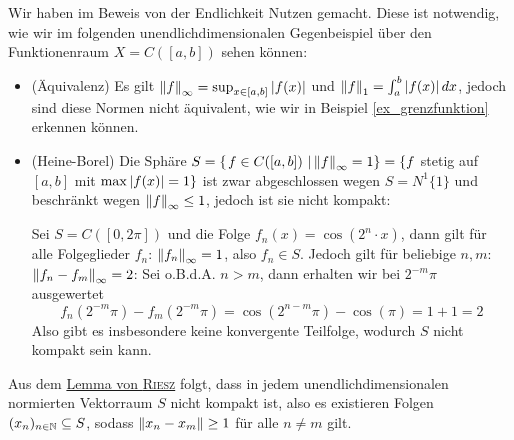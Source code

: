 \begin{remark}
Wir haben im Beweis von der Endlichkeit Nutzen gemacht. Diese ist notwendig, wie wir im folgenden unendlichdimensionalen Gegenbeispiel über den Funktionenraum $X = C([a,b])$ sehen können:

\begin{itemize}
    \item (Äquivalenz) Es gilt $\left\|f\right\|_\infty = \sup_{x\in[a,b]}\left|f(x)\right|$ und $\left\|f\right\|_1 = \int_a^b\left|f(x)\right|dx$, jedoch sind diese Normen nicht äquivalent, wie wir in Beispiel \ref{ex_grenzfunktion} erkennen können.
    \item (Heine-Borel) Die Sphäre $S = \left\{\left.f\in C([a,b]) \ \right| \left\|f\right\|_\infty = 1 \right\} = \{f$ stetig auf $[a,b]$ mit $\max\left|f(x)\right| = 1\}$ ist zwar abgeschlossen wegen $S=N^1{\{1\}}$ und beschränkt wegen $\left\|f\right\|_\infty\leq 1$, jedoch ist sie nicht kompakt:
    
    Sei $S = C([0, 2\pi])$ und die Folge $f_n(x) = \cos(2^n\cdot x)$, dann gilt für alle Folgeglieder $f_n$: $\left\|f_n\right\|_\infty = 1$, also $f_n \in S$. Jedoch gilt für beliebige $n,m$: $\left\|f_n - f_m\right\|_\infty = 2$: Sei o.B.d.A. $n>m$, dann erhalten wir bei $2^{-m}\pi$ ausgewertet 
    $$f_n(2^{-m}\pi) - f_m(2^{-m}\pi) = \cos(2^{n-m}\pi) - \cos(\pi) = 1 + 1 = 2$$
    Also gibt es insbesondere keine konvergente Teilfolge, wodurch $S$ nicht kompakt sein kann.
\end{itemize}
Aus dem \href{https://en.wikipedia.org/wiki/Riesz\%27s_lemma}{Lemma von \textsc{Riesz}} folgt, dass in jedem unendlichdimensionalen normierten Vektorraum $S$ nicht kompakt ist, also es existieren Folgen $(x_n)_{n\in \mathbb{N}} \subseteq S$, sodass $\left\|x_n - x_m\right\| \geq 1$ für alle $n\neq m$ gilt.
\end{remark}